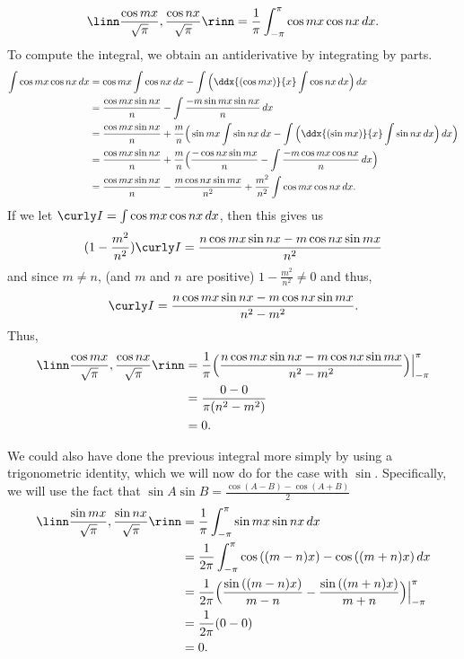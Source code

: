 \documentclass[12pt, letterpaper]{hmcpset}
\begin{document}
\begin{solution}
	\[
		\linn \frac{\cos{mx}}{\sqrt \pi}, \frac{\cos{nx}}{\sqrt \pi} \rinn = \frac{1}{\pi} \int_{-\pi}^\pi \cos{mx} \cos{nx} \, dx.
	\]
	To compute the integral, we obtain an antiderivative by integrating by parts.
	\[
		\begin{split}
			\int \cos{mx} \cos{nx} \, dx & = \cos{mx} \int \cos{nx} \, dx - \int \Big ( \ddx{(\cos{mx})}{x} \int \cos{nx} \, dx \Big ) \, dx \\
						     & = \frac{\cos{mx} \sin{nx}}{n} - \int \frac{- m \sin{mx} \sin{nx}}{n} \, dx \\
						     & = \frac{\cos{mx \sin{nx}}}{n} + \frac{m}{n} \Big ( \sin{mx} \int \sin{nx} \, dx - \int \Big ( \ddx{(\sin{mx})}{x} \int \sin{nx} \, dx \Big ) \, dx \Big ) \\
						     & = \frac{\cos{mx} \sin{nx}}{n} + \frac{m}{n} \Big ( \frac{- \cos{nx} \sin{mx}}{n} - \int \frac{-m \cos{mx} \cos{nx}}{n} \, dx \Big ) \\
						     & = \frac{\cos{mx}\sin{nx}}{n} - \frac{m \cos{nx} \sin{mx}}{n^2} + \frac{m^2}{n^2} \int \cos{mx} \cos{nx} \, dx.
		\end{split}
	\]
	If we let $\curly I = \int \cos{mx} \cos{nx} \, dx$, then this gives us
	\[
		(1 - \frac{m^2}{n^2}) \curly I = \frac{n \cos{mx} \sin{nx} - m \cos{nx} \sin{mx}}{n^2}
	\]
	and since $m \neq n$, (and $m$ and $n$ are positive) $1 - \frac{m^2}{n^2} \neq 0$ and thus,
	\[
		\curly I = \frac{n \cos{mx} \sin{nx} - m \cos{nx} \sin{mx}}{n^2 - m^2}.
	\]
	Thus,
	\[
		\begin{split}
			\linn \frac{\cos{mx}}{\sqrt \pi}, \frac{\cos{nx}}{\sqrt \pi} \rinn & = \frac{1}{\pi} \Big ( \frac{n \cos{mx} \sin{nx} - m \cos{nx} \sin{mx}}{n^2 - m^2} \Big ) \Big |_{-\pi}^\pi \\
											   & = \frac{0 - 0}{\pi (n^2 - m^2)} \\
											   & = 0.
		\end{split}
	\]

	We could also have done the previous integral more simply by using a trigonometric identity, which we will now do for the case with $\sin$. Specifically, we will use the fact that $\sin{A} \sin{B} = \frac{\cos{(A - B)} - \cos{(A + B)}}{2}$
	\[
		\begin{split}
			\linn \frac{\sin{mx}}{\sqrt \pi}, \frac{\sin{nx}}{\sqrt \pi} \rinn & = \frac{1}{\pi} \int_{-\pi}^\pi \sin{mx} \sin{nx} \, dx \\
											   & = \frac{1}{2 \pi} \int_{-\pi}^\pi \cos{((m - n)x)} - \cos{((m + n)x)} \, dx \\
											   & = \frac{1}{2 \pi} \Big ( \frac{\sin{((m - n)x)}}{m - n} - \frac{\sin{((m + n)x)}}{m + n} \Big ) \Big |_{-\pi}^\pi \\
											   & = \frac{1}{2 \pi} (0 - 0) \\
											   & = 0.
		\end{split}
	\]


\end{solution}
\end{document}
